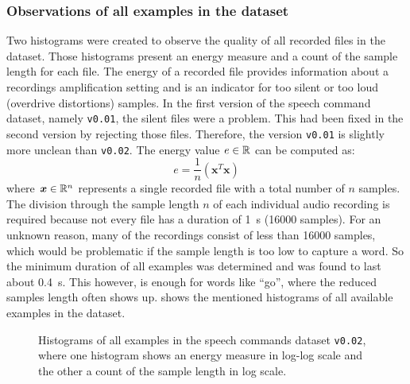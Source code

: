 \subsubsection{Observations of all examples in the dataset}
Two histograms were created to observe the quality of all recorded files in the dataset.
Those histograms present an energy measure and a count of the sample length for each file.
The energy of a recorded file provides information about a recordings amplification setting and is an indicator for too silent or too loud (overdrive distortions) samples.
In the first version of the speech command dataset, namely \texttt{v0.01}, the silent files were a problem.
This had been fixed in the second version by rejecting those files.
Therefore, the version \texttt{v0.01} is slightly more unclean than \texttt{v0.02}.
The energy value $e \in \mathbb{R}$ can be computed as:
\begin{equation}\label{eq:exp_dataset_energy}
  e = \frac{1}{n} \left( \bm{x}^T \bm{x} \right)
\end{equation}
where $\bm{x} \in \mathbb{R}^n$ represents a single recorded file with a total number of $n$ samples.
The division through the sample length $n$ of each individual audio recording is required because not every file has a duration of \SI{1}{\second} (16000 samples).
For an unknown reason, many of the recordings consist of less than 16000 samples, which would be problematic if the sample length is too low to capture a word.
So the minimum duration of all examples was determined and was found to last about \SI{0.4}{\second}.
This however, is enough for words like \enquote{go}, where the reduced samples length often shows up.
 shows the mentioned histograms of all available examples in the dataset.
\begin{figure}[!ht]
  \centering
    \qquad
  \caption{Histograms of all examples in the speech commands dataset \texttt{v0.02}, where one histogram shows an energy measure in log-log scale and the other a count of the sample length in log scale.}
  \label{fig:exp_dataset_hist}
\end{figure}
